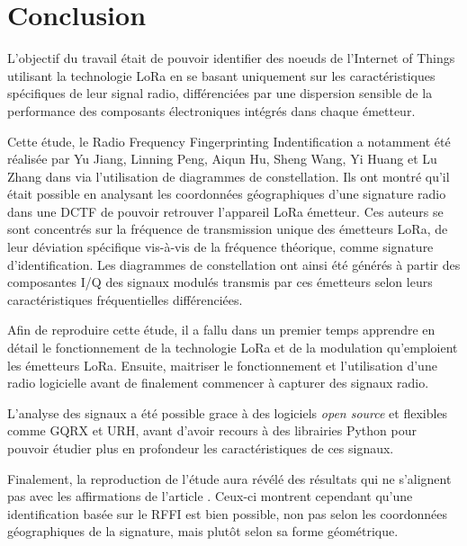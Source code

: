 \chapter*{Conclusion}
\renewcommand{\leftmark}{CONCLUSION}

L'objectif du travail était de pouvoir identifier des noeuds de l'Internet of Things utilisant la technologie \ac{LoRa} en se basant uniquement sur les caractéristiques spécifiques de leur signal radio, différenciées par une dispersion sensible de la performance des composants électroniques intégrés dans chaque émetteur.
\vspace{0.1cm}

Cette étude, le Radio Frequency Fingerprinting Indentification a notamment été réalisée par Yu Jiang, Linning Peng, Aiqun Hu, Sheng Wang, Yi Huang et Lu Zhang dans \cite{loraDCTF} via l'utilisation de diagrammes de constellation. Ils ont montré qu'il était possible en analysant les coordonnées géographiques d'une signature radio dans une \ac{DCTF} de pouvoir retrouver l'appareil \ac{LoRa} émetteur. Ces auteurs se sont concentrés sur la fréquence de transmission unique des émetteurs \ac{LoRa}, de leur déviation spécifique vis-à-vis de la fréquence théorique, comme signature d'identification. Les diagrammes de constellation ont ainsi été générés à partir des composantes \ac{I/Q} des signaux modulés transmis par ces émetteurs selon leurs caractéristiques fréquentielles différenciées.

\vspace{0.1cm}

Afin de reproduire cette étude, il a fallu dans un premier temps apprendre en détail le fonctionnement de la technologie \ac{LoRa} et  de la modulation qu'emploient les émetteurs \ac{LoRa}. Ensuite, maitriser le fonctionnement et l'utilisation d'une radio logicielle avant de finalement commencer à capturer des signaux radio.

\vspace{0.1cm}

L'analyse des signaux a été possible grace à des logiciels \textit{open source} et flexibles comme GQRX et \ac{URH}, avant d'avoir recours à des librairies Python pour pouvoir étudier plus en profondeur les caractéristiques de ces signaux.

\vspace{0.1cm}

Finalement, la reproduction de l'étude aura révélé des résultats qui ne s'ali\-gnent pas avec les affirmations de l'article \cite{loraDCTF}. Ceux-ci montrent cependant qu'une identification basée sur le \ac{RFFI} est bien possible, non pas selon les coordonnées géographiques de la signature, mais plutôt selon sa forme géométrique.


